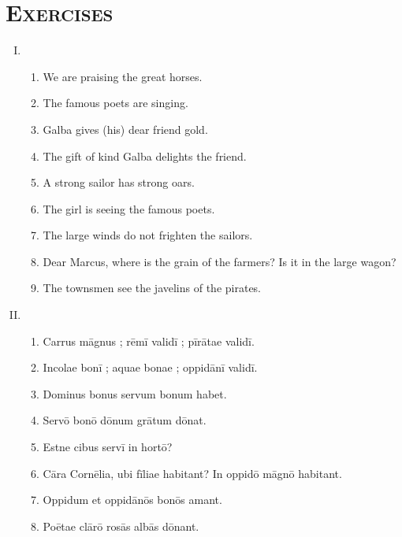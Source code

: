 \documentclass[12pt]{article}
\begin{document}
\section{\textsc{Exercises}}
\begin{enumerate}[I.]
	\setlength{\itemsep}{1em}
	\item \begin{enumerate}[1)]
		\item We are praising the great horses.
		\item The famous poets are singing.
		\item Galba gives (his) dear friend gold.
		\item The gift of kind Galba delights the friend.
		\item A strong sailor has strong oars.
		\item The girl is seeing the famous poets.
		\item The large winds do not frighten the sailors.
		\item Dear Marcus, where is the grain of the farmers? Is it in the large wagon?
		\item The townsmen see the javelins of the pirates.
	\end{enumerate}
	\item \begin{enumerate}[1)]
		\item Carrus māgnus ; rēmī validī ; pīrātae validī.
		\item Incolae bonī ; aquae bonae ; oppidānī validī.
		\item Dominus bonus servum bonum habet.
		\item Servō bonō dōnum grātum dōnat.
		\item Estne cibus servī in hortō?
		\item Cāra Cornēlia, ubi fīliae habitant? In oppidō māgnō habitant.
		\item Oppidum et oppidānōs bonōs amant.
		\item Poētae clārō rosās albās dōnant.
	\end{enumerate}
\end{enumerate}
\end{document}
